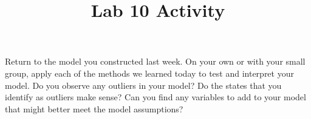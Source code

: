\documentclass[
  letterpaper,
  DIV=11,
  numbers=noendperiod]{scrartcl}
\title{Lab 10 Activity}
\author{}
\date{}
\begin{document}
\maketitle


Return to the model you constructed last week. On your own or with your
small group, apply each of the methods we learned today to test and
interpret your model. Do you observe any outliers in your model? Do the
states that you identify as outliers make sense? Can you find any
variables to add to your model that might better meet the model
assumptions?
\end{document}

